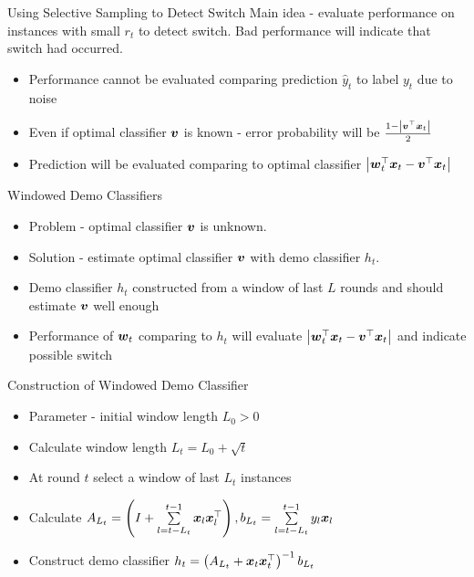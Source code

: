 \documentclass{beamer}
\begin{document}
\begin{frame}{Using Selective Sampling to Detect Switch}
 Main idea - evaluate performance on instances with small $r_t$ to detect switch.\newline\newline
Bad performance will indicate that switch had occurred.\newline
\begin{itemize}
\item Performance cannot be evaluated comparing prediction $\hat{y}_t$ to label $y_t$ due to noise\newline
\item Even if optimal classifier ${\boldsymbol{v}}$ is known - error probability will be  $\frac{1-\left|{{\boldsymbol{v}}}^{\top}{\boldsymbol{x}}_{t}\right|}{2}$\newline
\item Prediction will be evaluated comparing to optimal classifier $\left\vert{{\boldsymbol{w}}}^{\top}_{t}{\boldsymbol{x}}_{t}-{{\boldsymbol{v}}}^{\top}{\boldsymbol{x}}_{t}\right\vert$\newline
\end{itemize}
\end{frame}



\begin{frame}{Windowed Demo Classifiers}
\begin{itemize}
\item Problem - optimal classifier ${\boldsymbol{v}}$ is unknown.\newline
\item Solution - estimate optimal classifier ${\boldsymbol{v}}$ with demo classifier $h_t$. \newline
\item Demo classifier $h_t$  constructed from a window of last $L$ rounds and should estimate ${\boldsymbol{v}}$ well enough \newline
\item Performance of ${\boldsymbol{w}}_{t}$ comparing to $h_t$ will evaluate $\left\vert{{\boldsymbol{w}}}^{\top}_{t}{\boldsymbol{x}}_{t}-{{\boldsymbol{v}}}^{\top}{\boldsymbol{x}}_{t}\right\vert$ and indicate possible switch
\end{itemize}
\end{frame}


\begin{frame}{Construction of Windowed Demo Classifier}
\begin{itemize}
\item Parameter - initial window length $L_0>0$ \newline
\item Calculate window length $L_t=L_0+\sqrt{t}$\newline
\item At round $t$  select a window of last $L_t$ instances  \newline
\item Calculate $A_{L_t}=\left(I+\sum\limits_{l=t-L_t}^{t-1}{{\boldsymbol{x}}_{l}{{\boldsymbol{x}}}^{\top}_{l}}\right), b_{L_t}=\sum\limits_{l=t-L_t}^{t-1}y_l{\boldsymbol{x}}_{l}$ \newline
\item Construct demo classifier $h_t=\left(A_{L_t}+{\boldsymbol{x}}_{t}{{\boldsymbol{x}}}^{\top}_{t}\right)^{-1}b_{L_t}$
\end{itemize}
\end{frame}
\end{document}
